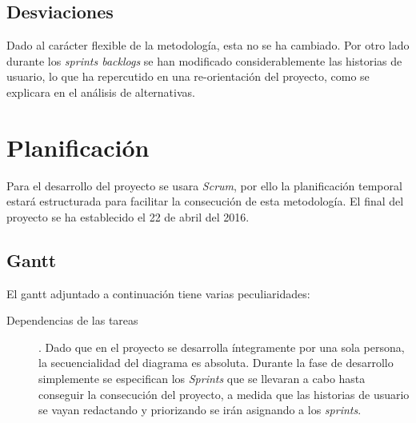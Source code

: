 \documentclass[12pt]{article} %
\begin{document}
\subsection{Desviaciones}
Dado al carácter flexible de la metodología, esta no se ha cambiado. Por otro lado durante los \textit{sprints backlogs} se han modificado considerablemente las historias de usuario, lo que ha repercutido en una re-orientación del proyecto, como se explicara en el análisis de alternativas.
\newpage

\section{Planificación}
Para el desarrollo del proyecto se usara \textit{Scrum}, por ello la planificación temporal estará estructurada para facilitar la consecución de esta metodología. El final del proyecto se ha establecido el 22 de abril del 2016.

\subsection{Gantt}
El gantt adjuntado a continuación tiene varias peculiaridades:
\begin{description}
\item [Dependencias de las tareas]. 
\linebreak Dado que en el proyecto se desarrolla íntegramente por una sola persona, la secuencialidad del diagrama es absoluta.
\linebreak Durante la fase de desarrollo simplemente se especifican los \textit{Sprints} que se llevaran a cabo hasta conseguir la consecución del proyecto, a medida que las historias de usuario se vayan redactando y priorizando se irán asignando a los \textit{sprints}.
\end{description}
\end{document}
